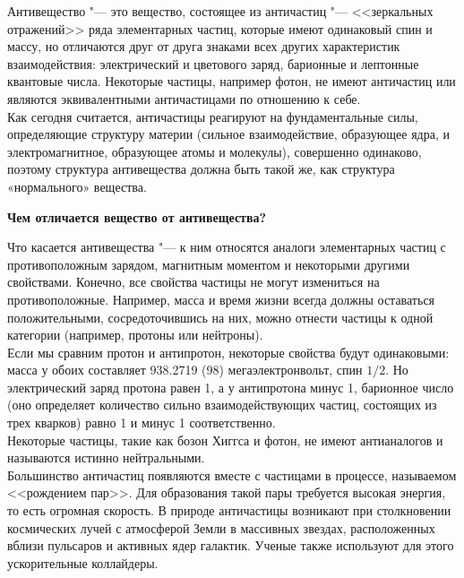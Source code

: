 \begin{flushleft}
Антивещество "--- это вещество, состоящее из античастиц "--- <<зеркальных отражений>> ряда элементарных
 частиц, которые имеют одинаковый спин и массу, но отличаются друг от друга знаками всех других 
 характеристик взаимодействия: электрический и цветового заряд, барионные и лептонные квантовые числа. 
 Некоторые частицы, например фотон, не имеют античастиц или являются эквивалентными античастицами по отношению к себе. \\
 
 Как сегодня считается, античастицы реагируют на фундаментальные силы, определяющие структуру материи 
 (сильное взаимодействие, образующее ядра, и электромагнитное, образующее атомы и молекулы), совершенно 
 одинаково, поэтому структура антивещества должна быть такой же, как структура «нормального» вещества.

 \newpage
 \textbf{Чем отличается вещество от антивещества?}
 \vspace*{14pt}

 Что касается антивещества "--- к ним относятся аналоги элементарных частиц с противоположным зарядом, 
 магнитным моментом и некоторыми другими свойствами. Конечно, все свойства частицы не могут измениться 
 на противоположные. Например, масса и время жизни всегда должны оставаться положительными, 
 сосредоточившись на них, можно отнести частицы к одной категории (например, протоны или нейтроны). \\

Если мы сравним протон и антипротон, некоторые свойства будут одинаковыми: масса у обоих составляет 938.2719 (98) 
мегаэлектронвольт, спин $1/2$. Но электрический заряд протона равен 1, а у антипротона минус 1, барионное число 
(оно определяет количество сильно взаимодействующих частиц, состоящих из трех кварков) равно 1 и минус 1 соответственно.\\

Некоторые частицы, такие как бозон Хиггса и фотон, не имеют антианалогов и называются истинно нейтральными.\\

Большинство античастиц появляются вместе с частицами в процессе, называемом <<рождением пар>>. Для образования 
такой пары требуется высокая энергия, то есть огромная скорость. В природе античастицы возникают при столкновении 
космических лучей с атмосферой Земли в массивных звездах, расположенных вблизи пульсаров и активных ядер 
галактик. Ученые также используют для этого ускорительные коллайдеры.\\


\end{flushleft}
